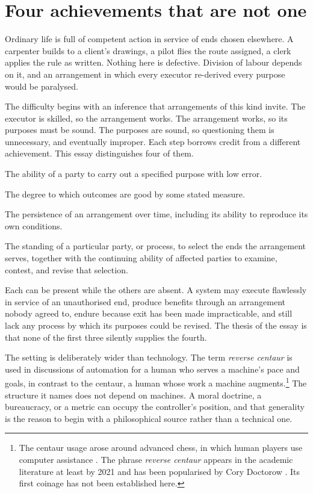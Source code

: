 \documentclass[11pt]{article}
\theoremstyle{definition}
\theoremstyle{remark}
\begin{document}
\section{Four achievements that are not one}

Ordinary life is full of competent action in service of ends chosen elsewhere. A carpenter builds to a client's drawings, a pilot flies the route assigned, a clerk applies the rule as written. Nothing here is defective. Division of labour depends on it, and an arrangement in which every executor re-derived every purpose would be paralysed.

The difficulty begins with an inference that arrangements of this kind invite. The executor is skilled, so the arrangement works. The arrangement works, so its purposes must be sound. The purposes are sound, so questioning them is unnecessary, and eventually improper. Each step borrows credit from a different achievement. This essay distinguishes four of them.

\begin{description}[leftmargin=1.5em,style=nextline]
\item[Reliable execution.] The ability of a party to carry out a specified purpose with low error.
\item[Beneficial consequence.] The degree to which outcomes are good by some stated measure.
\item[Organisational endurance.] The persistence of an arrangement over time, including its ability to reproduce its own conditions.
\item[Legitimate purpose-setting.] The standing of a particular party, or process, to select the ends the arrangement serves, together with the continuing ability of affected parties to examine, contest, and revise that selection.
\end{description}

Each can be present while the others are absent. A system may execute flawlessly in service of an unauthorised end, produce benefits through an arrangement nobody agreed to, endure because exit has been made impracticable, and still lack any process by which its purposes could be revised. The thesis of the essay is that none of the first three silently supplies the fourth.

The setting is deliberately wider than technology. The term \emph{reverse centaur} is used in discussions of automation for a human who serves a machine's pace and goals, in contrast to the centaur, a human whose work a machine augments.\footnote{The centaur usage arose around advanced chess, in which human players use computer assistance \cite{harmon2003,kasparov2017}. The phrase \emph{reverse centaur} appears in the academic literature at least by 2021 \cite{samothrakis2021} and has been popularised by Cory Doctorow \cite{doctorow2026}. Its first coinage has not been established here.} The structure it names does not depend on machines. A moral doctrine, a bureaucracy, or a metric can occupy the controller's position, and that generality is the reason to begin with a philosophical source rather than a technical one.
\end{document}
